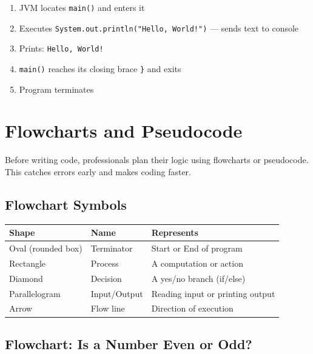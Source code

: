 \documentclass[12pt,a4paper,oneside]{book}
\begin{document}
\begin{dryrun}
\begin{enumerate}
  \item JVM locates \texttt{main()} and enters it
  \item Executes \texttt{System.out.println("Hello, World!")} --- sends text to console
  \item Prints: \texttt{Hello, World!}
  \item \texttt{main()} reaches its closing brace \texttt{\}} and exits
  \item Program terminates
\end{enumerate}
\end{dryrun}

\section{Flowcharts and Pseudocode}

Before writing code, professionals plan their logic using flowcharts or pseudocode. This catches errors early and makes coding faster.

\subsection{Flowchart Symbols}

\begin{center}
\begin{tabular}{lll}
\toprule
\textbf{Shape} & \textbf{Name} & \textbf{Represents}\\
\midrule
Oval (rounded box)  & Terminator    & Start or End of program\\
Rectangle           & Process       & A computation or action\\
Diamond             & Decision      & A yes/no branch (if/else)\\
Parallelogram       & Input/Output  & Reading input or printing output\\
Arrow               & Flow line     & Direction of execution\\
\bottomrule
\end{tabular}
\end{center}

\subsection{Flowchart: Is a Number Even or Odd?}
\end{document}
